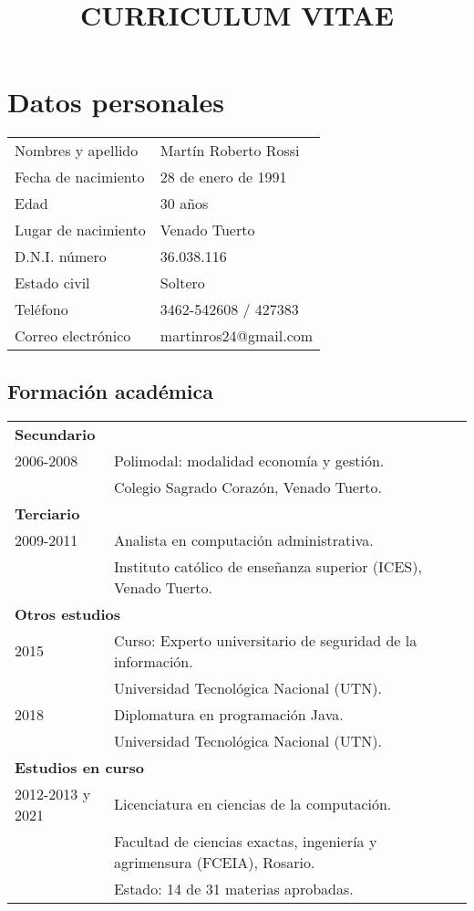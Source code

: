 \documentclass[12pt]{article}
\title{\huge{\textbf{CURRICULUM VITAE}}\vspace{-2.5ex}}
\date{}
\begin{document}
\maketitle
\section*{Datos personales}
\bgroup
\def\arraystretch{1.25}
\begin{tabular}{p{5cm} l}
  Nombres y apellido&Martín Roberto Rossi\\
  Fecha de nacimiento&28 de enero de 1991\\
  Edad&30 años\\
  Lugar de nacimiento&Venado Tuerto\\
  D.N.I. número&36.038.116\\
  Estado civil&Soltero\\
  Teléfono&3462-542608 / 427383\\
  Correo electrónico&martinros24@gmail.com\\
\end{tabular}
\setlength{\unitlength}{0.5cm}
\subsection*{Formación académica}
\begin{tabular}{p{3.8cm} l}
  \multicolumn{2}{l}{\textbf{Secundario}}\\
  2006-2008&Polimodal: modalidad economía y gestión.\\
           &\small{Colegio Sagrado Corazón, Venado Tuerto.}\\
  \multicolumn{2}{l}{\textbf{Terciario}}\\
  2009-2011&Analista en computación administrativa.\\
           &\small{Instituto católico de enseñanza superior (ICES), Venado Tuerto.}\\
  \multicolumn{2}{l}{\textbf{Otros estudios}}\\
  2015&Curso: Experto universitario de seguridad de la información.\\
           &\small{Universidad Tecnológica Nacional (UTN).}\\
  2018&Diplomatura en programación Java.\\
           &\small{Universidad Tecnológica Nacional (UTN).}\\
  \multicolumn{2}{l}{\textbf{Estudios en curso}}\\
  2012-2013 y 2021 &Licenciatura en ciencias de la computación.\\
           &\small{Facultad de ciencias exactas, ingeniería y agrimensura (FCEIA), Rosario.}\\
           &\small{Estado: 14 de 31 materias aprobadas.}\\
\end{tabular}
\end{document}
